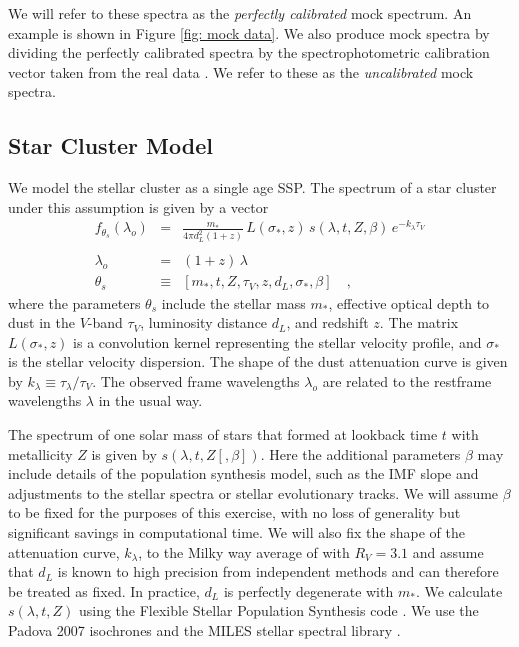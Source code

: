 \documentclass[iop,numberedappendix]{emulateapj}
\begin{document}
We will refer to these spectra as the \emph{perfectly calibrated} mock
spectrum.  An example is shown in Figure \ref{fig: mock data}. We also
produce mock spectra by dividing the perfectly calibrated spectra by
the spectrophotometric calibration vector taken from the real data
\citep[][Fig\ref{fig:ggc_spectrum}]{schiavon05}.  We refer to these as
the \emph{uncalibrated} mock spectra.

\subsection{Star Cluster Model}
\label{sec:cluster_model}
We model the stellar cluster as a single age SSP. The spectrum of a
star cluster under this assumption is given by a vector
\begin{eqnarray}\displaystyle
f_{\theta_s}(\lambda_o) & = &
\frac{m_*}{4\pi d_L^2(1+z)} \, L(\sigma_*, z) \, s(\lambda, t, Z , \beta) \, e^ {-k_\lambda\tau_V} \\
\nonumber \\ 
\lambda_o & = & (1+z)\,\lambda 
\\
\theta_s & \equiv & \left[ m_*, t, Z, \tau_V, z, d_L, \sigma_*, \beta \right]
\quad ,
\end{eqnarray} where the
parameters $\theta_s$ include 
the stellar mass $m_*$, 
effective optical depth to dust in the $V$-band $\tau_V$, 
luminosity distance $d_L$,
and redshift $z$.
The matrix $L(\sigma_*, z)$ is a convolution kernel representing the
stellar velocity profile,
and $\sigma_*$ is the stellar velocity dispersion. 
The shape of the dust attenuation curve is given by $k_\lambda \equiv
\tau_\lambda/\tau_V$.  
The observed frame wavelengths $\lambda_o$ are related to the
restframe wavelengths $\lambda$ in the usual way.

The spectrum of one solar mass of stars that formed at lookback time
$t$ with metallicity $Z$ is given by $s(\lambda, t, Z [, \beta])$.
Here the additional parameters $\beta$ may include details of the
population synthesis model, such as the IMF slope and adjustments to
the stellar spectra or stellar evolutionary tracks. We will assume
$\beta$ to be fixed for the purposes of this exercise, with no loss of
generality but significant savings in computational time.  We will
also fix the shape of the attenuation curve, $k_\lambda $, to the
Milky way average of \citet{CCM89} with $R_V=3.1$ and assume that
$d_L$ is known to high precision from independent methods and can
therefore be treated as fixed.  In practice, $d_L$ is perfectly
degenerate with $m_*$. We calculate $s(\lambda, t, Z)$ using the
Flexible Stellar Population Synthesis code \citep[FSPS][]{fsps}.  We
use the Padova 2007 isochrones \citep{girardi00, bertilli94, marigo07}
and the MILES stellar spectral library \citep{miles_I, miles_II,
miles_III}.
\end{document}
